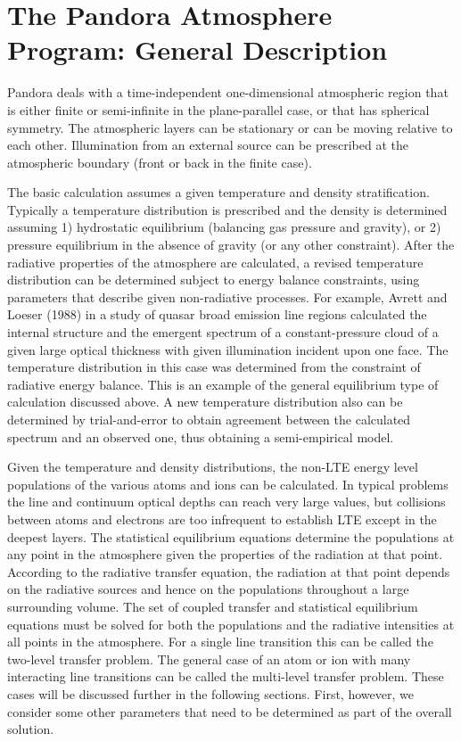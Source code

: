 \documentclass[11pt,twoside]{article}
\begin{document}
\section{The Pandora Atmosphere Program: General Description}

Pandora deals with a time-independent one-dimensional atmospheric 
region that is either finite or semi-infinite in the plane-parallel
case, or that has spherical symmetry. The atmospheric
layers can be stationary or can be moving relative to each
other. Illumination from an external source can be
prescribed at the atmospheric boundary (front or back in
the finite case).

The basic calculation assumes a given temperature and density stratification. 
Typically a temperature distribution is prescribed and the density is
determined assuming 1) hydrostatic equilibrium (balancing gas pressure 
and gravity), or 2) pressure equilibrium in the absence of gravity (or any
other constraint). After the radiative properties of the atmosphere are 
calculated, a revised temperature distribution can be determined subject 
to energy balance constraints, using parameters that describe given 
non-radiative processes.  For example, Avrett and Loeser (1988) in a study
of quasar broad emission line regions calculated the internal structure 
and the emergent spectrum of a constant-pressure cloud of a given large 
optical thickness with given illumination incident upon one face. The 
temperature distribution in this case was determined from the constraint 
of radiative energy balance.  This is an example of the general equilibrium
type of calculation discussed above.  A new temperature distribution also
can be determined by trial-and-error to obtain agreement between the
calculated spectrum and an observed one, thus obtaining a semi-empirical
model.  

Given the temperature and density distributions, the
non-LTE energy level populations of the various atoms and
ions can be calculated. In typical problems the line and
continuum optical depths can reach very large values, but collisions
between atoms and electrons are too infrequent to establish LTE
except in the deepest layers. The statistical equilibrium equations
determine the populations at any point in the atmosphere given the
properties of the radiation at that point. According to the
radiative transfer equation, the radiation at that point 
depends on the radiative sources and hence on the
populations throughout a large surrounding volume. The set
of coupled transfer and statistical equilibrium equations
must be solved for both the populations and the radiative
intensities at all points in the atmosphere. For a single
line transition this can be called the two-level transfer
problem. The general case of an atom or ion with many
interacting line transitions can be called the multi-level
transfer problem. These cases will be discussed further in
the following sections. First, however, we consider some 
other parameters that need to be determined as part of
the overall solution.
\end{document}
